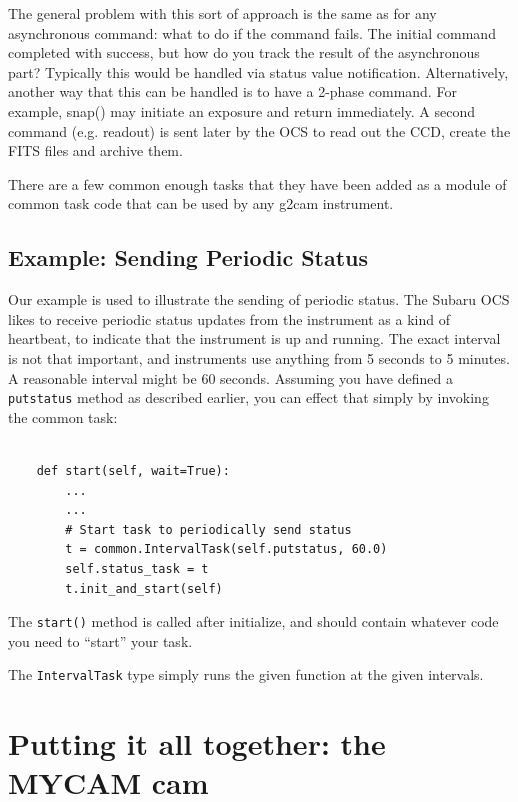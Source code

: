 \documentclass[11pt]{report}
\begin{document}
The general problem with this sort of approach is the same as for any
asynchronous command: what to do if the command fails. The initial
command completed with success, but how do you track the result of the
asynchronous part? Typically this would be handled via status value
notification. Alternatively, another way that this can be handled is to
have a 2-phase command. For example, snap() may initiate an exposure and
return immediately. A second command (e.g. readout) is sent later by the
OCS to read out the CCD, create the FITS files and archive them. 

There are a few common enough tasks that they have been added as a
module of common task code that can be used by any g2cam instrument.

\subsection{Example: Sending Periodic Status}
Our example is used to illustrate the sending of periodic status.
The Subaru OCS likes to receive periodic status updates from the
instrument as a kind of heartbeat, to indicate that the instrument is up
and running. The exact interval is not that important, and instruments
use anything from 5 seconds to 5 minutes. A reasonable interval might be
60 seconds. Assuming you have defined a {\tt putstatus} method as
described earlier, you can effect that simply by invoking the common task: 
\begin{verbatim}

    def start(self, wait=True):
        ...
        ...
        # Start task to periodically send status
        t = common.IntervalTask(self.putstatus, 60.0)
        self.status_task = t
        t.init_and_start(self)

\end{verbatim}
The {\tt start()} method is called after initialize, and should contain
whatever code you need to ``start'' your task. 

The {\tt IntervalTask} type simply runs the given function at the given
intervals.

\section{Putting it all together: the MYCAM cam}
\end{document}
